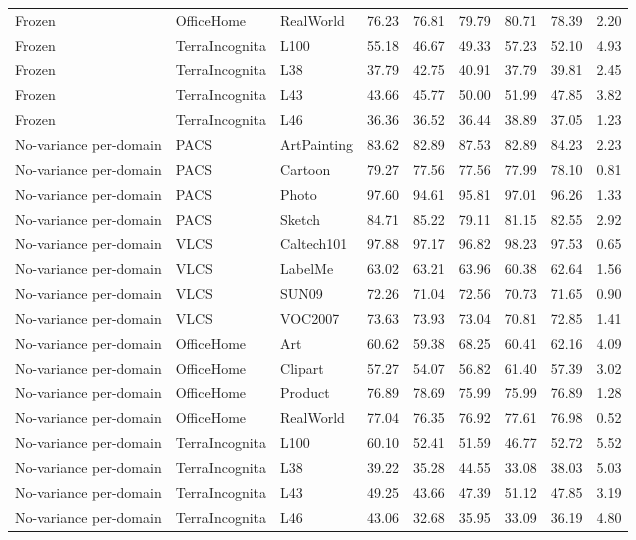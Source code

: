 \begin{longtable}{lllrrrrrr}
Frozen & OfficeHome & RealWorld & 76.23 & 76.81 & 79.79 & 80.71 & 78.39 & 2.20 \\
Frozen & TerraIncognita & L100 & 55.18 & 46.67 & 49.33 & 57.23 & 52.10 & 4.93 \\
Frozen & TerraIncognita & L38 & 37.79 & 42.75 & 40.91 & 37.79 & 39.81 & 2.45 \\
Frozen & TerraIncognita & L43 & 43.66 & 45.77 & 50.00 & 51.99 & 47.85 & 3.82 \\
Frozen & TerraIncognita & L46 & 36.36 & 36.52 & 36.44 & 38.89 & 37.05 & 1.23 \\
No-variance per-domain & PACS & ArtPainting & 83.62 & 82.89 & 87.53 & 82.89 & 84.23 & 2.23 \\
No-variance per-domain & PACS & Cartoon & 79.27 & 77.56 & 77.56 & 77.99 & 78.10 & 0.81 \\
No-variance per-domain & PACS & Photo & 97.60 & 94.61 & 95.81 & 97.01 & 96.26 & 1.33 \\
No-variance per-domain & PACS & Sketch & 84.71 & 85.22 & 79.11 & 81.15 & 82.55 & 2.92 \\
No-variance per-domain & VLCS & Caltech101 & 97.88 & 97.17 & 96.82 & 98.23 & 97.53 & 0.65 \\
No-variance per-domain & VLCS & LabelMe & 63.02 & 63.21 & 63.96 & 60.38 & 62.64 & 1.56 \\
No-variance per-domain & VLCS & SUN09 & 72.26 & 71.04 & 72.56 & 70.73 & 71.65 & 0.90 \\
No-variance per-domain & VLCS & VOC2007 & 73.63 & 73.93 & 73.04 & 70.81 & 72.85 & 1.41 \\
No-variance per-domain & OfficeHome & Art & 60.62 & 59.38 & 68.25 & 60.41 & 62.16 & 4.09 \\
No-variance per-domain & OfficeHome & Clipart & 57.27 & 54.07 & 56.82 & 61.40 & 57.39 & 3.02 \\
No-variance per-domain & OfficeHome & Product & 76.89 & 78.69 & 75.99 & 75.99 & 76.89 & 1.28 \\
No-variance per-domain & OfficeHome & RealWorld & 77.04 & 76.35 & 76.92 & 77.61 & 76.98 & 0.52 \\
No-variance per-domain & TerraIncognita & L100 & 60.10 & 52.41 & 51.59 & 46.77 & 52.72 & 5.52 \\
No-variance per-domain & TerraIncognita & L38 & 39.22 & 35.28 & 44.55 & 33.08 & 38.03 & 5.03 \\
No-variance per-domain & TerraIncognita & L43 & 49.25 & 43.66 & 47.39 & 51.12 & 47.85 & 3.19 \\
No-variance per-domain & TerraIncognita & L46 & 43.06 & 32.68 & 35.95 & 33.09 & 36.19 & 4.80 \\

\end{longtable}
